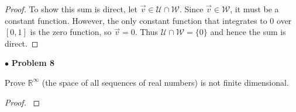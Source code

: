 \documentclass{article}
\begin{document}
\begin{proof}
To show this sum is direct, let $\vec{v} \in \mathcal{U} \cap \mathcal{W}$. Since $\vec{v} \in \mathcal{W}$, it must be a constant function. However, the only constant function that integrates to 0 over $[0,1]$ is the zero function, so $\vec{v} = 0$. Thus $\mathcal{U} \cap \mathcal{W} = \{ 0 \}$ and hence the sum is direct.
\end{proof}

\newpage
$ \bullet$ \textbf{Problem 8}
\medskip

\begin{itshape}
Prove $\mathbb{R}^ \infty$ (the space of all sequences of real numbers) is not finite dimensional.
\end{itshape}
\medskip

\begin{proof}
$ $\newline
\end{proof}
\end{document}
